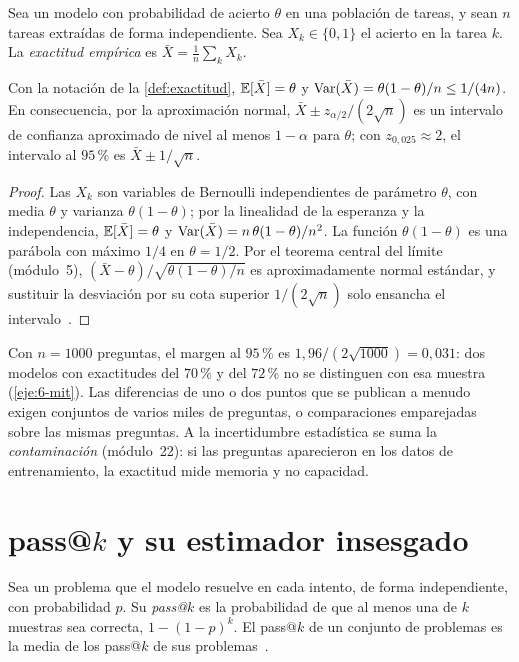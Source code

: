\begin{definicion}\label{def:exactitud}
Sea un modelo con probabilidad de acierto $\theta$ en una población de tareas, y sean $n$ tareas extraídas de forma independiente. Sea $X_k\in\{0,1\}$ el acierto en la tarea $k$. La \emph{exactitud empírica} es $\bar X=\frac1n\sum_kX_k$.
\end{definicion}

\begin{proposicion}\label{prop:ic}
Con la notación de la \cref{def:exactitud}, $\mathbb{E}[\bar X]=\theta$ y $\operatorname{Var}(\bar X)=\theta(1-\theta)/n\le 1/(4n)$. En consecuencia, por la aproximación normal, $\bar X\pm z_{\alpha/2}/(2\sqrt n)$ es un intervalo de confianza aproximado de nivel al menos $1-\alpha$ para $\theta$; con $z_{0{,}025}\approx 2$, el intervalo al $95\,\%$ es $\bar X\pm 1/\sqrt n$.
\end{proposicion}

\begin{proof}
Las $X_k$ son variables de Bernoulli independientes de parámetro $\theta$, con media $\theta$ y varianza $\theta(1-\theta)$; por la linealidad de la esperanza y la independencia, $\mathbb{E}[\bar X]=\theta$ y $\operatorname{Var}(\bar X)=n\,\theta(1-\theta)/n^{2}$. La función $\theta(1-\theta)$ es una parábola con máximo $1/4$ en $\theta=1/2$. Por el teorema central del límite (módulo~5), $(\bar X-\theta)/\sqrt{\theta(1-\theta)/n}$ es aproximadamente normal estándar, y sustituir la desviación por su cota superior $1/(2\sqrt n)$ solo ensancha el intervalo~\cite[clase~23, §3]{mit1805}.
\end{proof}

Con $n=1000$ preguntas, el margen al $95\,\%$ es $1{,}96/(2\sqrt{1000})=0{,}031$: dos modelos con exactitudes del $70\,\%$ y del $72\,\%$ no se distinguen con esa muestra (\cref{eje:6-mit}). Las diferencias de uno o dos puntos que se publican a menudo exigen conjuntos de varios miles de preguntas, o comparaciones emparejadas sobre las mismas preguntas. A la incertidumbre estadística se suma la \emph{contaminación} (módulo~22): si las preguntas aparecieron en los datos de entrenamiento, la exactitud mide memoria y no capacidad.

\section{pass@\texorpdfstring{$k$}{k} y su estimador insesgado}

\begin{definicion}[pass@$k$]\label{def:passk}
Sea un problema que el modelo resuelve en cada intento, de forma independiente, con probabilidad $p$. Su \emph{pass@$k$} es la probabilidad de que al menos una de $k$ muestras sea correcta, $1-(1-p)^{k}$. El pass@$k$ de un conjunto de problemas es la media de los pass@$k$ de sus problemas~\cite[§2.1]{chen}.
\end{definicion}

